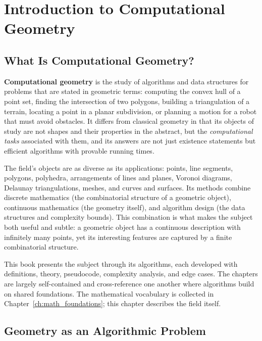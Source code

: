\chapter{Introduction to Computational Geometry}
\label{ch:introduction}

\section{What Is Computational Geometry?}
\label{sec:intro_what_is}

\textbf{Computational geometry} is the study of algorithms and data
structures for problems that are stated in geometric terms: computing the
convex hull of a point set, finding the intersection of two polygons,
building a triangulation of a terrain, locating a point in a planar
subdivision, or planning a motion for a robot that must avoid obstacles.
It differs from classical geometry in that its objects of study are not
shapes and their properties in the abstract, but the \emph{computational
tasks} associated with them, and its answers are not just existence
statements but efficient algorithms with provable running times.

The field's objects are as diverse as its applications: points, line
segments, polygons, polyhedra, arrangements of lines and planes, Voronoi
diagrams, Delaunay triangulations, meshes, and curves and surfaces. Its
methods combine discrete mathematics (the combinatorial structure of a
geometric object), continuous mathematics (the geometry itself), and
algorithm design (the data structures and complexity bounds). This
combination is what makes the subject both useful and subtle: a geometric
object has a continuous description with infinitely many points, yet its
interesting features are captured by a finite combinatorial structure.

This book presents the subject through its algorithms, each developed with
definitions, theory, pseudocode, complexity analysis, and edge cases. The
chapters are largely self-contained and cross-reference one another where
algorithms build on shared foundations. The mathematical vocabulary is
collected in Chapter~\ref{ch:math_foundations}; this chapter describes the
field itself.


\section{Geometry as an Algorithmic Problem}
\label{sec:intro_algorithmic_problem}

